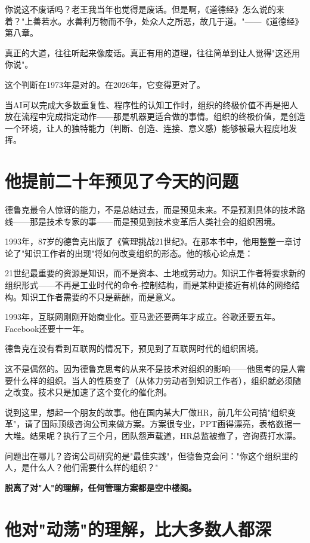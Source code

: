 你说这不废话吗？老王我当年也觉得是废话。但是啊，《道德经》怎么说的来着？"上善若水。水善利万物而不争，处众人之所恶，故几于道。"——《道德经》第八章。

真正的大道，往往听起来像废话。真正有用的道理，往往简单到让人觉得"这还用你说"。

这个判断在1973年是对的。在2026年，它变得更对了。

当AI可以完成大多数重复性、程序性的认知工作时，组织的终极价值不再是把人放在流程中完成指定动作——那是机器更适合做的事情。组织的终极价值，是创造一个环境，让人的独特能力（判断、创造、连接、意义感）能够被最大程度地发挥。


\section{他提前二十年预见了今天的问题}


德鲁克最令人惊讶的能力，不是总结过去，而是预见未来。不是预测具体的技术路线——那是技术专家的事——而是预见到技术变革后人类社会的组织困境。

1993年，87岁的德鲁克出版了《管理挑战21世纪》。在那本书中，他用整整一章讨论了"知识工作者的出现"将如何改变组织的形态。他的核心论点是：

21世纪最重要的资源是知识，而不是资本、土地或劳动力。知识工作者将要求新的组织形式——不再是工业时代的命令-控制结构，而是某种更接近有机体的网络结构。知识工作者需要的不只是薪酬，而是意义。

1993年，互联网刚刚开始商业化。亚马逊还要两年才成立。谷歌还要五年。Facebook还要十一年。

德鲁克在没有看到互联网的情况下，预见到了互联网时代的组织困境。

这不是偶然的。因为德鲁克思考的从来不是技术对组织的影响——他思考的是人需要什么样的组织。当人的性质变了（从体力劳动者到知识工作者），组织就必须随之改变。技术只是加速了这个变化的催化剂。

说到这里，想起一个朋友的故事。他在国内某大厂做HR，前几年公司搞"组织变革"，请了国际顶级咨询公司来做方案。方案很专业，PPT画得漂亮，表格数据一大堆。结果呢？执行了三个月，团队怨声载道，HR总监被撤了，咨询费打水漂。

问题出在哪儿？咨询公司研究的是"最佳实践"，但德鲁克会问："你这个组织里的人，是什么人？他们需要什么样的组织？"

\textbf{脱离了对"人"的理解，任何管理方案都是空中楼阁。}


\section{他对"动荡"的理解，比大多数人都深}


